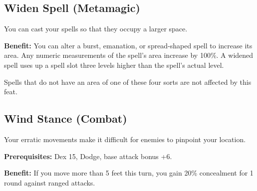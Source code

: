 \subsection{Widen Spell (Metamagic)}

				
You can cast your spells so that they occupy a larger space.
				
\textbf{Benefit:} You can alter a burst, emanation, or spread-shaped spell to increase its area. Any numeric measurements of the spell's area increase by 100\%. A widened spell uses up a spell slot three levels higher than the spell's actual level.

Spells that do not have an area of one of these four sorts are not affected by this feat.
				
\subsection{Wind Stance (Combat)}

				
Your erratic movements make it difficult for enemies to pinpoint your location.
				
\textbf{Prerequisites:} Dex 15, Dodge, base attack bonus +6.
				
\textbf{Benefit:} If you move more than 5 feet this turn, you gain 20\% concealment for 1 round against ranged attacks.
                
		
